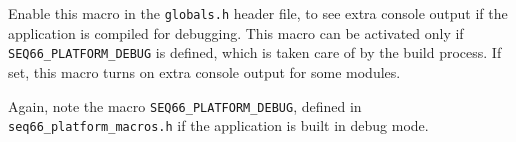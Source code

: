 %
%
%
%
%

      Enable this macro in the
      \texttt{globals.h} header file, to see extra console
      output if the application is compiled for debugging.  This macro can be
      activated only if \texttt{SEQ66\_PLATFORM\_DEBUG} is defined, which is taken
      care of by the build process.  If set, this macro turns on extra
      console output for some modules.


      Again, note the macro \texttt{SEQ66\_PLATFORM\_DEBUG},
      defined in \texttt{seq66_platform\_macros.h} if the application is
      built in debug mode.


